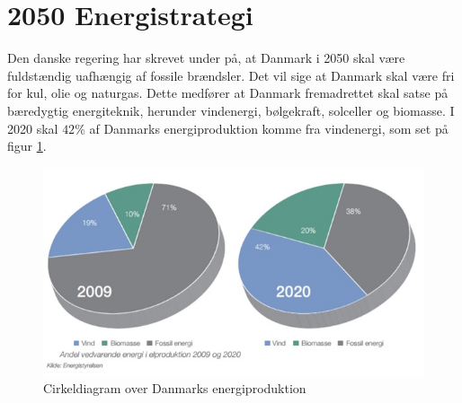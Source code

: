 \section{2050 Energistrategi}

Den danske regering har skrevet under på, at Danmark i 2050 skal være fuldstændig uafhængig af fossile brændsler. Det vil sige at Danmark skal være fri for kul, olie og naturgas. Dette medfører at Danmark fremadrettet skal satse på bæredygtig energiteknik, herunder vindenergi, bølgekraft, solceller og biomasse. I 2020 skal $42 \%$ af Danmarks energiproduktion komme fra vindenergi, som set på figur \ref{fig:Cirkel}.

\begin{figure}[H]
\includegraphics[scale=0.85]{Billeder/Cirkeldiagram_probana}
\caption{Cirkeldiagram over Danmarks energiproduktion}
\label{fig:Cirkel}
\end{figure}

